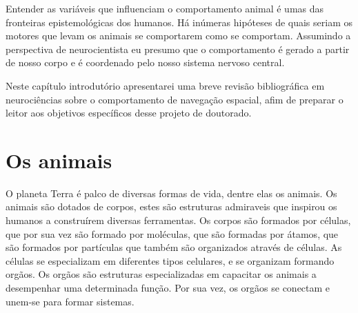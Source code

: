 
\label{Cap:introducao}

Entender as variáveis que influenciam o comportamento animal é umas das fronteiras epistemológicas dos humanos.
Há inúmeras hipóteses de quais seriam os motores que levam os animais se comportarem como se comportam.
Assumindo a perspectiva de neurocientista eu presumo que o comportamento é gerado a partir de nosso corpo e é coordenado pelo nosso sistema nervoso central.

Neste capítulo introdutório apresentarei uma breve revisão bibliográfica em neurociências sobre o comportamento de navegação espacial, afim de preparar o leitor aos objetivos específicos desse projeto de doutorado.

\section{Os animais}

O planeta Terra é palco de diversas formas de vida, dentre elas os animais.
Os animais são dotados de corpos, estes são estruturas admiraveis que inspirou os humanos a construírem diversas ferramentas.
Os corpos são formados por células, que por sua vez são formado por moléculas, que são formadas por átamos, que são formados por partículas que também são organizados através de células.
As células se especializam em diferentes tipos celulares, e se organizam formando orgãos.
Os orgãos são estruturas especializadas em capacitar os animais a desempenhar uma determinada função.
Por sua vez, os orgãos se conectam e unem-se para formar sistemas.

